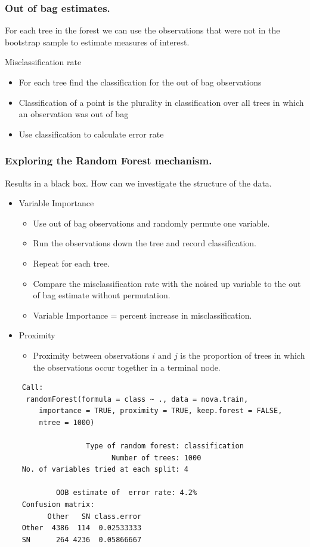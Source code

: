 \documentclass{beamer}
\begin{document}
\begin{frame}
	\frametitle{Out of bag estimates.}
	For each tree in the forest we can use the observations that were not in the bootstrap sample to estimate measures of interest.
	
	\item{Misclassification rate}
	\begin{itemize}
		\item 		For each tree find the classification for the out of bag observations
		\item 		Classification of a point is the plurality in classification over all trees in which an observation was out of bag 
		\item 		Use classification to calculate error rate
	\end{itemize}
		
\end{frame}

\begin{frame}
	\frametitle{Exploring the Random Forest mechanism.}
	Results in a black box.  How can we investigate the structure of the data.
	\begin{itemize}
		\item Variable Importance
			\begin{itemize}
				\item Use out of bag observations and randomly permute one variable.  
				\item Run the observations down the tree and record classification.
				\item Repeat for each tree.
				\item Compare the misclassification rate with the noised up variable to the out of bag estimate without permutation.
				\item Variable Importance = percent increase in misclassification.
			\end{itemize}
		\item Proximity
		\begin{itemize}
			\item Proximity between observations $i$ and $j$ is the proportion of trees in which the observations occur together in a terminal node.
		\end{itemize}
	\end{itemize}
\end{frame}


\begin{frame}[fragile]
	\begin{small}
	\begin{verbatim}
	Call:
	 randomForest(formula = class ~ ., data = nova.train,
	 	importance = TRUE, proximity = TRUE, keep.forest = FALSE,
	 	ntree = 1000) 
	
	               Type of random forest: classification
	                     Number of trees: 1000
	No. of variables tried at each split: 4

	        OOB estimate of  error rate: 4.2%
	Confusion matrix:
	      Other   SN class.error
	Other  4386  114  0.02533333
	SN      264 4236  0.05866667
	\end{verbatim}
	\end{small}
\end{frame}
\end{document}

